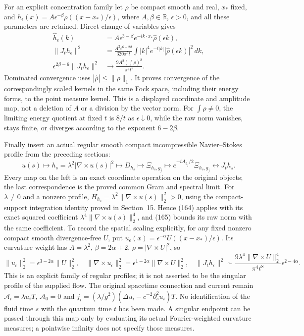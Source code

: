 \documentclass[11pt]{article}
\begin{document}
For an explicit concentration family let $\rho$ be compact smooth
and real, $x_*$ fixed, and
$h_\epsilon(x)=A\epsilon^{-\beta}\rho((x-x_*)/\epsilon)$,
where $A,\beta\in\mathbb R$, $\epsilon>0$, and all these parameters
are retained. Direct change of variables gives
\begin{align}
 \widehat h_\epsilon(k)
   &=A\epsilon^{3-\beta}e^{-ik\cdot x_*}\widehat\rho(\epsilon k),
       \nonumber\\
 \|J_t h_\epsilon\|^2
   &= \frac{A^2\epsilon^{6-2\beta}}{320\pi^5t}
       \int |k|^4e^{-t|k|}|\widehat\rho(\epsilon k)|^2\,dk,
       \label{eq:full-concentration}\\
 \epsilon^{2\beta-6}\|J_t h_\epsilon\|^2
   &\longrightarrow \frac{9A^2(\int\rho)^2}{\pi^4t^8}.
       \nonumber
\end{align}
Dominated convergence uses $|\widehat\rho|\le\|\rho\|_1$.
It proves convergence of the correspondingly scaled kernels in
the same Fock space, including their energy forms, to the point
measure kernel. This is a displayed coordinate and amplitude map,
not a deletion of $A$ or a division by the vector norm. For
$\int\rho\ne0$, the limiting energy quotient at fixed $t$ is
$8/t$ as $\epsilon\downarrow0$, while the raw norm vanishes,
stays finite, or diverges according to the exponent $6-2\beta$.

Finally insert an actual regular smooth compact incompressible
Navier--Stokes profile from the preceding sections:
\begin{equation}\label{eq:full-NS-chain}
 u(s)\longmapsto h_s=\lambda^2|\nabla\times u(s)|^2
 \longmapsto D_{h_s}\longmapsto\Xi_{h_s,g_j}
 \longmapsto e^{-tA_{g_j}/2}\Xi_{h_s,g_j}
 \longleftrightarrow J_t h_s .
\end{equation}
Every map on the left is an exact coordinate operation on the
original objects; the last correspondence is the proved common
Gram and spectral limit. For $\lambda\ne0$ and a nonzero profile,
$H_{h_s}=\lambda^2\|\nabla\times u(s)\|_2^2>0$, using the
compact-support integration identity proved in Section~15. Hence
(164) applies with its exact squared
coefficient $\lambda^4\|\nabla\times u(s)\|_2^4$, and
(165) bounds its raw norm with the same
coefficient. To record the spatial scaling explicitly, for any
fixed nonzero compact smooth divergence-free $U$, put
$u_\epsilon(x)=\epsilon^{-\alpha}U((x-x_*)/\epsilon)$.
Its curvature weight has $A=\lambda^2$,
$\beta=2\alpha+2$, $\rho=|\nabla\times U|^2$, so
\[
 \|u_\epsilon\|_2^2=\epsilon^{3-2\alpha}\|U\|_2^2,
 \quad \|\nabla\times u_\epsilon\|_2^2
          =\epsilon^{1-2\alpha}\|\nabla\times U\|_2^2,
 \quad \|J_t h_\epsilon\|^2
       \sim \frac{9\lambda^4\|\nabla\times U\|_2^4}{\pi^4t^8}
                    \epsilon^{2-4\alpha}.
\]
This is an explicit family of regular profiles; it is not asserted
to be the singular profile of the supplied flow. The original
spacetime connection and current remain
$\mathcal A_i=\lambda u_iT$, $\mathcal A_0=0$ and
$j_i=(\lambda/g^2)(\Delta u_i-c^{-2}\partial_s^2u_i)T$.
No identification of the fluid time $s$ with the quantum time $t$
has been made. A singular endpoint can be passed through this
map only by evaluating its actual Fourier-weighted curvature
measures; a pointwise infinity does not specify those measures.
\end{document}
